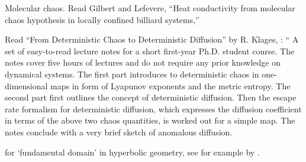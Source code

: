 {Molecular chaos.}{
Read  Gilbert  and Lefevere,
    ``Heat conductivity from molecular chaos hypothesis
             in locally confined billiard systems,''
    } %

Read
``From Deterministic Chaos to Deterministic Diffusion''
by R. Klages, : ``
A set of easy-to-read lecture notes for a short first-year Ph.D.
student course. The notes cover five hours of lectures and
do not require any prior knowledge on dynamical systems. The first part introduces
to deterministic chaos in one-dimensional maps in form of Lyapunov exponents
and the metric entropy. The second part first outlines the concept of
deterministic diffusion. Then the escape rate formalism for deterministic
diffusion, which expresses the diffusion coefficient in terms of the above two
chaos quantities, is worked out for a simple map. The notes conclude with a
very brief sketch of anomalous diffusion.

{for `fundamental domain' in hyperbolic geometry, see for example
by .
    }
